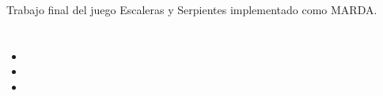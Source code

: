 \documentclass[letterpaper,10pt,english]{sphinxmanual}
\begin{document}
\subsection{}
\label{\detokenize{proyecto:descripcion-del-proyecto}}
Trabajo final del juego Escaleras y Serpientes implementado como MARDA.


\chapter{}
\label{\detokenize{Escaleras_y_Serpientes:indices}}\begin{itemize}
\item {} 

\item {} 

\item {} 

\end{itemize}
\end{document}
